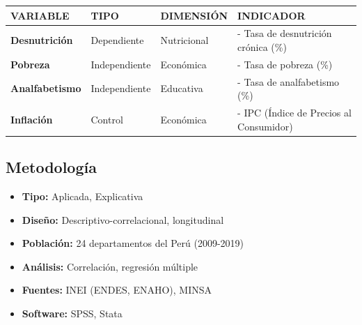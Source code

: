 \documentclass[
  man,
  floatsintext,
  longtable,
  a4paper,
  nolmodern,
  notxfonts,
  notimes,
  12pt,
  colorlinks=true,linkcolor=blue,citecolor=blue,urlcolor=blue]{apa7}
\providecommand{\tightlist}{%
  \setlength{\itemsep}{0pt}\setlength{\parskip}{0pt}}
\newcounter{none} %
\begin{document}
{\def\LTcaptype{none} %
\begin{longtable}[]{@{}
  >{\raggedright\arraybackslash}p{}
  >{\raggedright\arraybackslash}p{}
  >{\raggedright\arraybackslash}p{}
  >{\raggedright\arraybackslash}p{}@{}}
\toprule\noalign{}
\begin{minipage}[b]{\linewidth}\raggedright
VARIABLE
\end{minipage} & \begin{minipage}[b]{\linewidth}\raggedright
TIPO
\end{minipage} & \begin{minipage}[b]{\linewidth}\raggedright
DIMENSIÓN
\end{minipage} & \begin{minipage}[b]{\linewidth}\raggedright
INDICADOR
\end{minipage} \\
\midrule\noalign{}
\endhead
\bottomrule\noalign{}
\endlastfoot
\textbf{Desnutrición} & Dependiente & Nutricional & - Tasa de
desnutrición crónica (\%) \\
\textbf{Pobreza} & Independiente & Económica & - Tasa de pobreza (\%) \\
\textbf{Analfabetismo} & Independiente & Educativa & - Tasa de
analfabetismo (\%) \\
\textbf{Inflación} & Control & Económica & - IPC (Índice de Precios al
Consumidor) \\
\end{longtable}
}

\subsection{Metodología}\label{metodologuxeda-10}

\begin{itemize}
\tightlist
\item
  \textbf{Tipo:} Aplicada, Explicativa
\item
  \textbf{Diseño:} Descriptivo-correlacional, longitudinal
\item
  \textbf{Población:} 24 departamentos del Perú (2009-2019)
\item
  \textbf{Análisis:} Correlación, regresión múltiple
\item
  \textbf{Fuentes:} INEI (ENDES, ENAHO), MINSA
\item
  \textbf{Software:} SPSS, Stata
\end{itemize}
\end{document}
